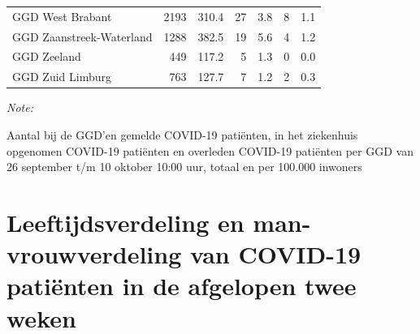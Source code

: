 \documentclass[
  english,
  man,floatsintext]{apa6}
\begin{document}
\begin{table}[H]
\begin{threeparttable}
\begin{tabular}{lrrrrrr}
GGD West Brabant & 2193 & 310.4 & 27 & 3.8 & 8 & 1.1\\
GGD Zaanstreek-Waterland & 1288 & 382.5 & 19 & 5.6 & 4 & 1.2\\
GGD Zeeland & 449 & 117.2 & 5 & 1.3 & 0 & 0.0\\
GGD Zuid Limburg & 763 & 127.7 & 7 & 1.2 & 2 & 0.3\\
\bottomrule
\end{tabular}
\begin{tablenotes}
\item \textit{Note: } 
\item Aantal bij de GGD’en gemelde COVID-19 patiënten, in het ziekenhuis opgenomen COVID-19 patiënten en overleden COVID-19 patiënten per GGD van 26 september t/m 10 oktober 10:00 uur, totaal en per 100.000 inwoners
\end{tablenotes}
\end{threeparttable}
\endgroup{}
\end{table}

\newpage

\hypertarget{leeftijdsverdeling-en-man-vrouwverdeling-van-covid-19-patiuxebnten-in-de-afgelopen-twee-weken}{%
\section{Leeftijdsverdeling en man-vrouwverdeling van COVID-19 patiënten in de afgelopen twee weken}\label{leeftijdsverdeling-en-man-vrouwverdeling-van-covid-19-patiuxebnten-in-de-afgelopen-twee-weken}}
\end{document}

